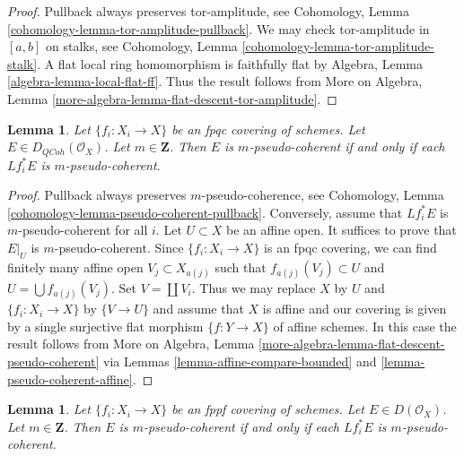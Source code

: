 \documentclass{stacks-project}
\theoremstyle{plain}
\newtheorem{lemma}[subsection]{Lemma}
\theoremstyle{definition}
\theoremstyle{remark}
\numberwithin{equation}{subsection}
\def\QCoh{\mathit{QCoh}}
\begin{document}
\begin{proof}
Pullback always preserves tor-amplitude, see
Cohomology, Lemma \ref{cohomology-lemma-tor-amplitude-pullback}.
We may check tor-amplitude in $[a, b]$ on stalks, see
Cohomology, Lemma \ref{cohomology-lemma-tor-amplitude-stalk}.
A flat local ring homomorphism is faithfully flat by
Algebra, Lemma \ref{algebra-lemma-local-flat-ff}.
Thus the result follows from
More on Algebra, Lemma
\ref{more-algebra-lemma-flat-descent-tor-amplitude}.
\end{proof}

\begin{lemma}
\label{lemma-pseudo-coherent-descends-fpqc}
Let $\{f_i : X_i \to X\}$ be an fpqc covering of schemes. Let
$E \in D_\QCoh(\mathcal{O}_X)$. Let $m \in \mathbf{Z}$.
Then $E$ is $m$-pseudo-coherent if and only if each
$Lf_i^*E$ is $m$-pseudo-coherent.
\end{lemma}

\begin{proof}
Pullback always preserves $m$-pseudo-coherence, see
Cohomology, Lemma \ref{cohomology-lemma-pseudo-coherent-pullback}.
Conversely, assume that $Lf_i^*E$ is $m$-pseudo-coherent for all $i$.
Let $U \subset X$ be an affine open. It suffices to prove that
$E|_U$ is $m$-pseudo-coherent. Since $\{f_i : X_i \to X\}$ is an
fpqc covering, we can find finitely many affine open $V_j \subset X_{a(j)}$
such that $f_{a(j)}(V_j) \subset U$ and $U = \bigcup f_{a(j)}(V_j)$.
Set $V = \coprod V_i$.
Thus we may replace $X$ by $U$ and $\{f_i : X_i \to X\}$ by
$\{V \to U\}$ and assume that $X$ is affine and our covering
is given by a single surjective flat morphism $\{f : Y \to X\}$
of affine schemes. In this case the result follows from
More on Algebra, Lemma \ref{more-algebra-lemma-flat-descent-pseudo-coherent}
via Lemmas \ref{lemma-affine-compare-bounded} and
\ref{lemma-pseudo-coherent-affine}.
\end{proof}

\begin{lemma}
\label{lemma-pseudo-coherent-descends-fppf}
Let $\{f_i : X_i \to X\}$ be an fppf covering of schemes. Let
$E \in D(\mathcal{O}_X)$. Let $m \in \mathbf{Z}$.
Then $E$ is $m$-pseudo-coherent if and only if each
$Lf_i^*E$ is $m$-pseudo-coherent.
\end{lemma}
\end{document}
